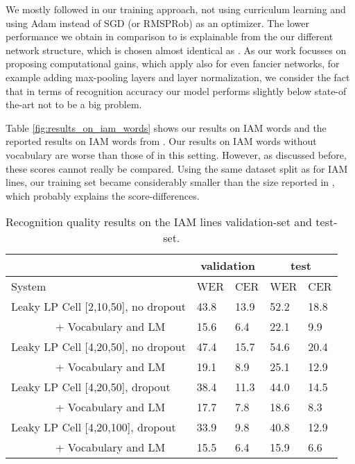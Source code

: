 \documentclass[conference]{IEEEtran}
\begin{document}
We mostly followed \cite{Voigtlaender2016} in our training approach, not using curriculum learning and using Adam instead of SGD (or RMSPRob)
as an optimizer. The lower performance we obtain in comparison to \cite{Voigtlaender2016} is explainable from the our different network structure, 
which is chosen almost identical as \cite{PhamEtAl2014}. 
As our work focusses on proposing computational gains, which apply also for even fancier networks, 
for example adding max-pooling layers and layer normalization, we consider the fact that in terms of recognition accuracy our model performs slightly 
below state-of the-art not to be a big problem.

Table \ref{fig:results_on_iam_words} shows our results on IAM words and the reported results on IAM words from \cite{PhamEtAl2014}. Our results on 
IAM words without vocabulary are worse than those of \cite{PhamEtAl2014} in this setting. However, as discussed before, these scores cannot really be compared. 
Using the same dataset split as for IAM lines,  our training set became considerably smaller than the size reported in \cite{PhamEtAl2014}, 
which probably explains the score-differences.



\begin{table}
\caption{Recognition quality results on the IAM  lines validation-set and test-set.}
\centering
 \begin{tabular}{|l|l|l|l|l|}
 \hline
 & \multicolumn{2}{|c|}{validation} &  \multicolumn{2}{|c|}{test}\\
 \hline
 System & WER & CER & WER & CER \\
 \hline
 Leaky LP Cell [2,10,50], no dropout  & 43.8 & 13.9 & 52.2 & 18.8  \\
 \ \ \ \ \ \ \ \ + Vocabulary and LM  & 15.6  & 6.4 & 22.1 &  9.9 \\
 Leaky LP Cell [4,20,50], no dropout  & 47.4 & 15.7  & 54.6  &  20.4  \\
 \ \ \ \ \ \ \ \ + Vocabulary and LM  &  19.1  & 8.9  & 25.1 &  12.9  \\
 \hline
 Leaky LP Cell [4,20,50], dropout  & 38.4 & 11.3 & 44.0 & 14.5 \\
 \ \ \ \ \ \ \ \ + Vocabulary and LM  & 17.7 &  7.8 & 18.6 &  8.3 \\
 Leaky LP Cell [4,20,100], dropout  & 33.9 & 9.8& 40.8 & 12.9  \\
 \ \ \ \ \ \ \ \ + Vocabulary and LM  & 15.5 & 6.4 & 15.9 & 6.6 \\
 \hline
 \end{tabular}
\label{fig:results_on_iam_test-set_using_language_model}
\end{table}
\end{document}
